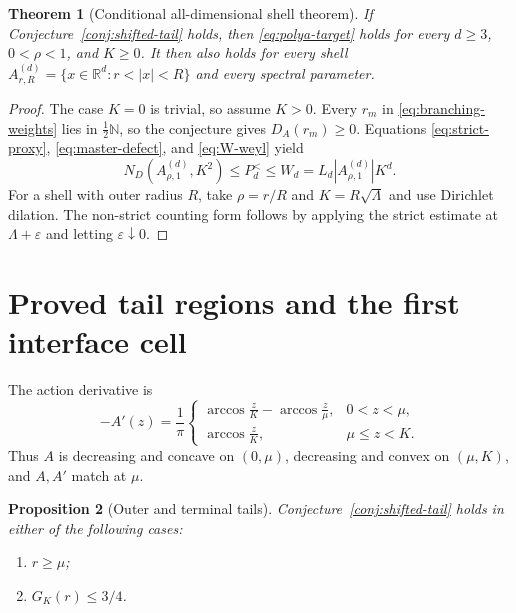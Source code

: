 \documentclass[11pt]{article}
\newtheorem{theorem}{Theorem}[section]
\newtheorem{proposition}[theorem]{Proposition}
\theoremstyle{remark}
\newcommand{\R}{\mathbb R}
\newcommand{\N}{\mathbb N}
\begin{document}
\begin{theorem}[Conditional all-dimensional shell theorem]
\label{thm:conditional}
If Conjecture~\ref{conj:shifted-tail} holds, then
\eqref{eq:polya-target} holds for every $d\geq3$, $0<\rho<1$, and $K\geq0$.
It then also holds for every shell
$A_{r,R}^{(d)}=\{x\in\R^d:r<|x|<R\}$ and every spectral parameter.
\end{theorem}

\begin{proof}
The case $K=0$ is trivial, so assume $K>0$.
Every $r_m$ in \eqref{eq:branching-weights} lies in $\tfrac12\N$, so the
conjecture gives $D_A(r_m)\geq0$.  Equations
\eqref{eq:strict-proxy}, \eqref{eq:master-defect}, and
\eqref{eq:W-weyl} yield
\[
 N_D(A_{\rho,1}^{(d)},K^2)\leq P_d^{<}\leq W_d
 =L_d|A_{\rho,1}^{(d)}|K^d.
\]
For a shell with outer radius $R$, take $\rho=r/R$ and
$K=R\sqrt\Lambda$ and use Dirichlet dilation.  The non-strict counting
form follows by applying the strict estimate at $\Lambda+\varepsilon$ and
letting $\varepsilon\downarrow0$.
\end{proof}

\section{Proved tail regions and the first interface cell}
\label{sec:tail-progress}

The action derivative is
\begin{equation}
 -A'(z)=\frac1\pi
 \begin{cases}
 \displaystyle\arccos\frac zK-\arccos\frac z\mu,&0<z<\mu,\\[2mm]
 \displaystyle\arccos\frac zK,&\mu\leq z<K.
 \end{cases}
 \label{eq:action-slope}
\end{equation}
Thus $A$ is decreasing and concave on $(0,\mu)$, decreasing and convex on
$(\mu,K)$, and $A,A'$ match at $\mu$.

\begin{proposition}[Outer and terminal tails]
\label{prop:easy-tails}
Conjecture~\ref{conj:shifted-tail} holds in either of the following cases:
\begin{enumerate}
 \item $r\geq\mu$;
 \item $G_K(r)\leq3/4$.
\end{enumerate}
\end{proposition}
\end{document}

